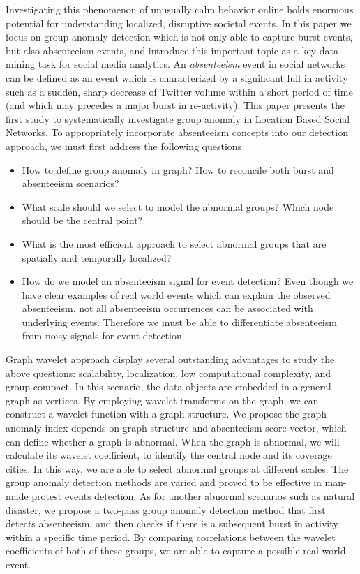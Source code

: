 Investigating this phenomenon of unusually calm behavior online holds enormous potential for understanding localized, disruptive societal events.
In this paper we focus on group anomaly detection which is not only able to capture burst events, but also absenteeism events, and introduce this important topic as a key data mining task for social media analytics.
An \textit{absenteeism} event in social networks can be defined as an event which is characterized by a significant lull in activity such as a sudden, sharp decrease of Twitter volume within a short period of time (and which may precedes a major burst in re-activity).
This paper presents the first study to systematically investigate group anomaly in Location Based Social Networks.
To appropriately incorporate absenteeism concepts into our detection approach, we must first address the following questions
\begin{itemize}
\item How to define group anomaly in graph? How to reconcile both burst and absenteeism scenarios?
\item What scale should we select to model the abnormal groups? Which node should be the central point?
\item What is the most efficient approach to select abnormal groups that are spatially and temporally localized?
\item How do we model an absenteeism signal for event detection? Even though we have clear examples of real world events which can explain the observed absenteeism, not all absenteeism occurrences can be associated with underlying events. Therefore we must be able to differentiate absenteeism from noisy signals for event detection.
\end{itemize}

Graph wavelet approach display several outstanding advantages to study the above
questions: scalability, localization, low computational complexity, and group compact. In this scenario, the data objects are embedded in a general graph as vertices.
By employing wavelet transforms on the graph, we can construct a wavelet function with a graph structure. We propose the graph anomaly index depends on graph structure and absenteeism score vector, which can define whether a graph is abnormal. When the graph is abnormal, we will calculate its wavelet coefficient, to identify the central node and its coverage cities. In this way, we are able to select abnormal groups at different scales. The group anomaly detection methods are varied and proved to be effective in man-made protest events detection. As for another abnormal scenarios such as natural disaster, we propose a two-pass group anomaly detection method that first detects absenteeism, and then checks if there is a subsequent burst in activity within a specific time period. By comparing correlations between the wavelet coefficients of both of these groups, we are able to capture a possible real world event.

